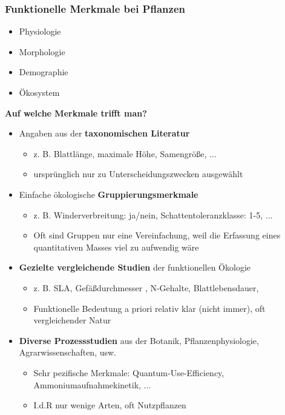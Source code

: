 \subsubsection{Funktionelle Merkmale bei Pflanzen}
\begin{itemize}
	\item Physiologie
	\item Morphologie
	\item Demographie
	\item Ökosystem
\end{itemize}

\newpage
\textbf{Auf welche Merkmale trifft man?}
\begin{itemize}
	\item Angaben aus der \textbf{taxonomischen Literatur}
	\begin{itemize}
		\item z. B. Blattlänge, maximale Höhe, Samengröße, ...
		\item ursprünglich nur zu Unterscheidungszwecken ausgewählt
	\end{itemize}
	\item Einfache ökologische \textbf{Gruppierungsmerkmale}
	\begin{itemize}
		\item z. B. Winderverbreitung: ja/nein, Schattentoleranzklasse: 1-5, ...
		\item Oft sind Gruppen nur eine Vereinfachung, weil die Erfassung eines quantitativen Masses viel zu aufwendig wäre
	\end{itemize}
	\item \textbf{Gezielte vergleichende Studien} der funktionellen Ökologie
	\begin{itemize}
		\item z. B. SLA, Gefäßdurchmesser , N-Gehalte, Blattlebensdauer,
		\item Funktionelle Bedeutung a priori relativ klar (nicht immer), oft vergleichender Natur
	\end{itemize}
	\item \textbf{Diverse Prozessstudien} aus der Botanik, Pflanzenphysiologie, Agrarwissenschaften, usw.
	\begin{itemize}
		\item Sehr pezifische Merkmale: Quantum-Use-Efficiency, Ammoniumaufnahmekinetik, ...
		\item I.d.R nur wenige Arten, oft Nutzpflanzen
	\end{itemize}
\end{itemize}

